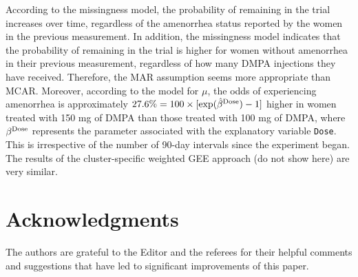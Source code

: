 According to the missingness model, the probability of remaining in the trial increases over time, regardless of the amenorrhea status reported by the women in the previous measurement. In addition, the missingness model indicates that the probability of remaining in the trial is higher for women without amenorrhea in their previous measurement, regardless of how many DMPA injections they have received. Therefore, the MAR assumption seems more appropriate than MCAR. Moreover, according to the model for $\mu$, the odds of experiencing amenorrhea is approximately $27.6\%=100\times[\exp(\hat{\beta}^{\rm Dose})-1]$ higher in women treated with 150 mg of DMPA than those treated with 100 mg of DMPA, where ${\beta}^{\rm Dose}$ represents the parameter associated with the explanatory variable {\tt Dose}. This is irrespective of the number of 90-day intervals since the experiment began. The results of the cluster-specific weighted GEE approach (do not show here) are very similar.

\section*{Acknowledgments}
The authors are grateful to the Editor and the referees for their helpful comments and suggestions that have led to significant improvements of this paper.



\address{L.H. Vanegas\\
  Departamento de Estad\'istica, Universidad Nacional\\
  Ciudad Universitaria, Bogot\'a\\
  Colombia\\
  }

\address{L.M. Rond\'on\\
  Departamento de Estad\'istica, Universidad Nacional\\
  Ciudad Universitaria, Bogot\'a\\
  Colombia\\
  }

\address{G.A. Paula\\
  Instituto de Matem\'{a}tica e Estat\'istica, Universidade de S\~{a}o Paulo\\
  Rua do Mat\~ao, 1010, S\~{a}o Paulo\\
  Brazil\\
  }
